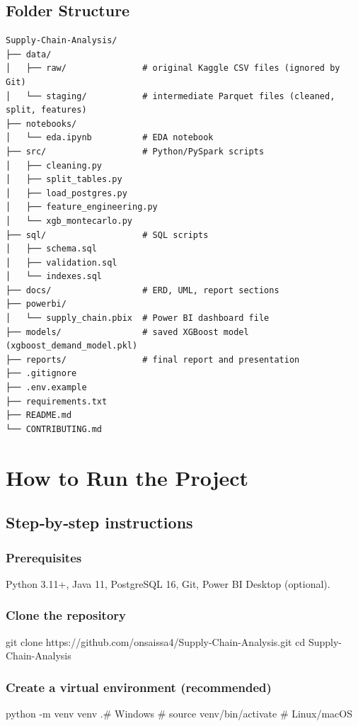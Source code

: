 \documentclass[12pt, a4paper]{report}
\begin{document}
\section{Folder Structure}
\begin{tcolorbox}[colback=lightbg, colframe=teal, boxrule=1pt, arc=4pt, left=6pt, right=6pt, top=6pt, bottom=6pt, fontupper=\small]
\begin{verbatim}
Supply-Chain-Analysis/
├── data/
│   ├── raw/               # original Kaggle CSV files (ignored by Git)
│   └── staging/           # intermediate Parquet files (cleaned, split, features)
├── notebooks/
│   └── eda.ipynb          # EDA notebook
├── src/                   # Python/PySpark scripts
│   ├── cleaning.py
│   ├── split_tables.py
│   ├── load_postgres.py
│   ├── feature_engineering.py
│   └── xgb_montecarlo.py
├── sql/                   # SQL scripts
│   ├── schema.sql
│   ├── validation.sql
│   └── indexes.sql
├── docs/                  # ERD, UML, report sections
├── powerbi/
│   └── supply_chain.pbix  # Power BI dashboard file
├── models/                # saved XGBoost model (xgboost_demand_model.pkl)
├── reports/               # final report and presentation
├── .gitignore
├── .env.example
├── requirements.txt
├── README.md
└── CONTRIBUTING.md
\end{verbatim}
\end{tcolorbox}

\chapter{How to Run the Project}
\section{Step‑by‑step instructions}
\subsection{Prerequisites}
Python 3.11+, Java 11, PostgreSQL 16, Git, Power BI Desktop (optional).

\subsection{Clone the repository}
\begin{codebox}
git clone https://github.com/onsaissa4/Supply-Chain-Analysis.git
cd Supply-Chain-Analysis
\end{codebox}

\subsection{Create a virtual environment (recommended)}
\begin{codebox}
python -m venv venv
.\venv\Scripts\activate   # Windows
# source venv/bin/activate   # Linux/macOS
\end{codebox}
\end{document}
